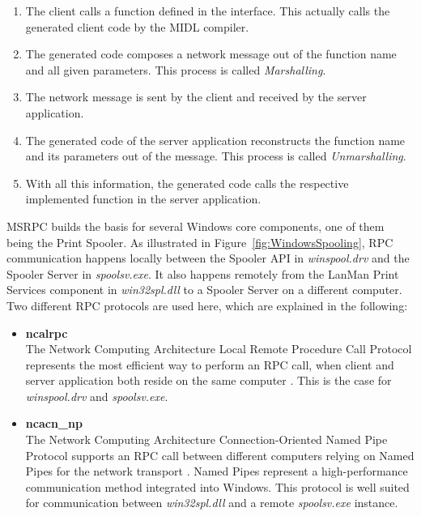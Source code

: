 \begin{enumerate}
	\item The client calls a function defined in the interface.
				This actually calls the generated client code by the MIDL compiler.
	\item The generated code composes a network message out of the function name and all given parameters.
				This process is called \emph{Marshalling}.
	\item The network message is sent by the client and received by the server application.
	\item The generated code of the server application reconstructs the function name and its parameters out of the message.
				This process is called \emph{Unmarshalling}.
	\item With all this information, the generated code calls the respective implemented function in the server application.
\end{enumerate}

MSRPC builds the basis for several Windows core components, one of them being the Print Spooler.
As illustrated in Figure~\ref{fig:WindowsSpooling}, \gls{RPC} communication happens locally between the Spooler \gls{API} in \emph{winspool.drv} and the Spooler Server in \emph{spoolsv.exe}.
It also happens remotely from the LanMan Print Services component in \emph{win32spl.dll} to a Spooler Server on a different computer.
Two different \gls{RPC} protocols are used here, which are explained in the following:

\begin{itemize}
	\item \textbf{ncalrpc} \\
				The Network Computing Architecture Local Remote Procedure Call Protocol represents the most efficient way to perform an \gls{RPC} call, when client and server application both reside on the same computer \cite{msdn2015protseq}.
				This is the case for \emph{winspool.drv} and \emph{spoolsv.exe}.
	\item \textbf{ncacn\_np} \\
				The Network Computing Architecture Connection-Oriented Named Pipe Protocol supports an \gls{RPC} call between different computers relying on Named Pipes for the network transport \cite{microsoft2015msrpce}.
				Named Pipes represent a high-performance communication method integrated into Windows.
				This protocol is well suited for communication between \emph{win32spl.dll} and a remote \emph{spoolsv.exe} instance.
\end{itemize}

